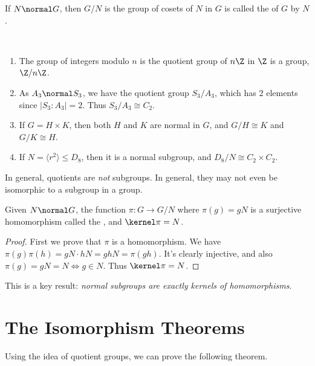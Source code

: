 \documentclass[a4]{scrreprt}
\begin{document}
\begin{definition}
	If $N \normal G$, then $G/N$ is the group of cosets of $N$ in $G$ is called the  of $G$ by $N$.
\end{definition}

\begin{example}~
	    \vspace*{-1.5\baselineskip}
	\begin{enumerate}[label=(\roman*)]
		\item The group of integers modulo $n$ is the quotient group of $n\Z$ in $\Z$ is a group, $\Z/n\Z$.
		\item As $A_3 \normal S_3$, we have the quotient group $S_3/A_3$, which has 2 elements since $|S_3 : A_3| = 2$. Thus $S_3 / A_3 \cong C_2$.
		\item If $G = H \times K$, then both $H$ and $K$ are normal in $G$, and $G/H \cong K$ and $G/K \cong H$.
		\item If $N = \langle r^2 \rangle \leq D_8$, then it is a normal subgroup, and $D_8/N \cong C_2 \times C_2$. 
	\end{enumerate}
\end{example}

\begin{remark}
	In general, quotients are \emph{not} subgroups. In general, they may not even be isomorphic to a subgroup in a group.
\end{remark}

\begin{theorem}
	Given $N \normal G$, the function $\pi : G \rightarrow G/N$ where $\pi(g) = gN$ is a surjective homomorphism called the , and $\kernel \pi = N$.
\end{theorem}
\begin{proof}
	First we prove that $\pi$ is a homomorphism. We have $\pi(g)\pi(h) = gN \cdot hN = gh N = \pi(gh)$. It's clearly injective, and also $\pi(g)= gN = N \iff g \in N$. Thus $\kernel \pi = N$.
\end{proof}

This is a key result: \emph{normal subgroups are exactly kernels of homomorphisms}.

\section{The Isomorphism Theorems}

Using the idea of quotient groups, we can prove the following theorem.
\end{document}
